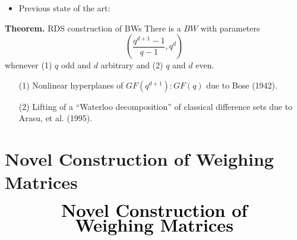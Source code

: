 \documentclass{beamer}
\begin{document}
\begin{frame}

  \begin{itemize}
  \item Previous state of the art:
  \end{itemize}

  \begin{block}{{\bf Theorem.} RDS construction of BWs}
    There is a $BW$ with parameters
    \[
      \left(
        \frac{q^{d+1}-1}{q-1}, q^d
      \right)
    \]
    whenever (1) $q$ odd and $d$ arbitrary and (2) $q$ and $d$ even.
  \end{block}

  \begin{itemize}
  \item[(1)] Nonlinear hyperplanes of $GF(q^{d+1}) : GF(q)$ due to Bose (1942).
  \item[(2)] Lifting of a ``Waterloo decomposition'' of classical difference
    sets due to Arasu, et al. (1995).
  \end{itemize}

\end{frame}


\section{Novel Construction of Weighing Matrices}

\begin{frame}
  \[
    \begin{array}{c}
      \text{\huge\bf Novel Construction of}
      \\
      \text{\huge\bf Weighing Matrices}
    \end{array}
  \]
\end{frame}



\end{document}
